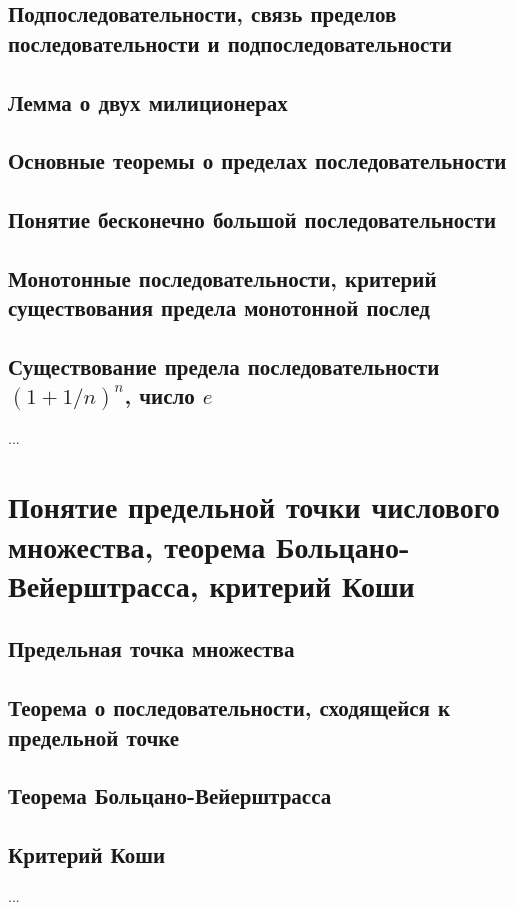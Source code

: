 \subsection{Подпоследовательности, связь пределов последовательности и подпоследовательности}
\subsection{Лемма о двух милиционерах}
\subsection{Основные теоремы о пределах последовательности}
\subsection{Понятие бесконечно большой последовательности}
\subsection{Монотонные последовательности, критерий существования предела монотонной послед}
\subsection{Существование предела последовательности $(1+1/n)^n$, число $e$ }
...

\section{Понятие предельной точки числового множества, теорема Больцано-Вейерштрасса, критерий Коши}
\subsection{Предельная точка множества}
\subsection{Теорема о последовательности, сходящейся к предельной точке}
\subsection{Теорема Больцано-Вейерштрасса}

\subsection{Критерий Коши}

...

